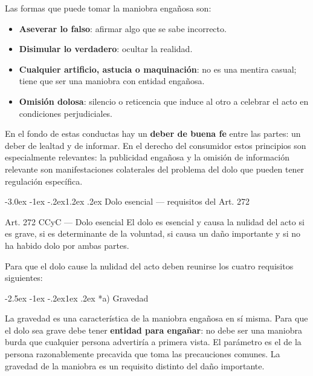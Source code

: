 \documentclass[12pt,oneside]{book}
\makeatletter
\renewcommand\section{\@startsection{section}{1}{\z@}%
  {-3.0ex \@plus -1ex \@minus -.2ex}{1.2ex \@plus .2ex}%
  {\normalfont\large\bfseries\color{acento}}}
\renewcommand\subsection{\@startsection{subsection}{2}{\z@}%
  {-2.5ex \@plus -1ex \@minus -.2ex}{1ex \@plus .2ex}%
  {\normalfont\normalsize\bfseries}}
\makeatother
\begin{document}
Las formas que puede tomar la maniobra engañosa son:
\begin{itemize}
    \item \textbf{Aseverar lo falso}: afirmar algo que se sabe incorrecto.
    \item \textbf{Disimular lo verdadero}: ocultar la realidad.
    \item \textbf{Cualquier artificio, astucia o maquinación}: no es una mentira casual; tiene que ser una maniobra con entidad engañosa.
    \item \textbf{Omisión dolosa}: silencio o reticencia que induce al otro a celebrar el acto en condiciones perjudiciales.
\end{itemize}

\begin{nota}
En el fondo de estas conductas hay un \textbf{deber de buena fe} entre las partes: un deber de lealtad y de informar. En el derecho del consumidor estos principios son especialmente relevantes: la publicidad engañosa y la omisión de información relevante son manifestaciones colaterales del problema del dolo que pueden tener regulación específica.
\end{nota}

\section{Dolo esencial --- requisitos del Art. 272}

\begin{articulo}{Art. 272 CCyC --- Dolo esencial}
El dolo es esencial y causa la nulidad del acto si es grave, si es determinante de la voluntad, si causa un daño importante y si no ha habido dolo por ambas partes.
\end{articulo}

Para que el dolo cause la nulidad del acto deben reunirse los cuatro requisitos siguientes:

\subsection*{a) Gravedad}

La gravedad es una característica de la maniobra engañosa en sí misma. Para que el dolo sea grave debe tener \textbf{entidad para engañar}: no debe ser una maniobra burda que cualquier persona advertiría a primera vista. El parámetro es el de la persona razonablemente precavida que toma las precauciones comunes. La gravedad de la maniobra es un requisito distinto del daño importante.
\end{document}
